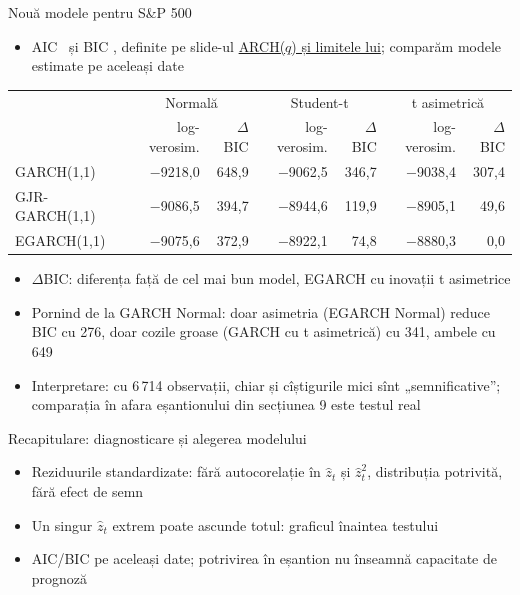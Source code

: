 \begin{frame}{Nouă modele pentru S\&P 500}
\itemsize{\footnotesize}
\begin{itemize}
    \item AIC \ și BIC , definite pe slide-ul \hyperlink{ch5-aicbic}{ARCH($q$) și limitele lui}; comparăm modele estimate pe aceleași date
\end{itemize}\begin{center}
\scriptsize
\begin{tabular}{lrrrrrr}
\toprule
& \multicolumn{2}{c}{Normală} & \multicolumn{2}{c}{Student-t} & \multicolumn{2}{c}{t asimetrică} \\ & log-verosim. & $\Delta$BIC & log-verosim. & $\Delta$BIC & log-verosim. & $\Delta$BIC \\
\midrule
GARCH(1,1) & \ensuremath{-}9218{,}0 & 648{,}9 & \ensuremath{-}9062{,}5 & 346{,}7 & \ensuremath{-}9038{,}4 & 307{,}4 \\
GJR-GARCH(1,1) & \ensuremath{-}9086{,}5 & 394{,}7 & \ensuremath{-}8944{,}6 & 119{,}9 & \ensuremath{-}8905{,}1 & 49{,}6 \\
EGARCH(1,1) & \ensuremath{-}9075{,}6 & 372{,}9 & \ensuremath{-}8922{,}1 & 74{,}8 & \ensuremath{-}8880{,}3 & 0{,}0 \\
\bottomrule
\end{tabular}
\end{center}
\begin{itemize}
    \item $\Delta$BIC: diferența față de cel mai bun model, EGARCH cu inovații t asimetrice
    \item Pornind de la GARCH Normal: doar asimetria (EGARCH Normal) reduce BIC cu 276, doar cozile groase (GARCH cu t asimetrică) cu 341, ambele cu 649
    \item Interpretare: cu 6\,714 observații, chiar și cîștigurile mici sînt „semnificative”; comparația în afara eșantionului din secțiunea 9 este testul real
\end{itemize}
\end{frame}

\begin{frame}{Recapitulare: diagnosticare și alegerea modelului}
\itemsize{\small}
\begin{itemize}
    \item Reziduurile standardizate: fără autocorelație în $\hat z_t$ și $\hat z_t^2$, distribuția potrivită, fără efect de semn
    \item Un singur $\hat z_t$ extrem poate ascunde totul: graficul înaintea testului
    \item AIC/BIC pe aceleași date; potrivirea în eșantion nu înseamnă capacitate de prognoză
\end{itemize}
\end{frame}


